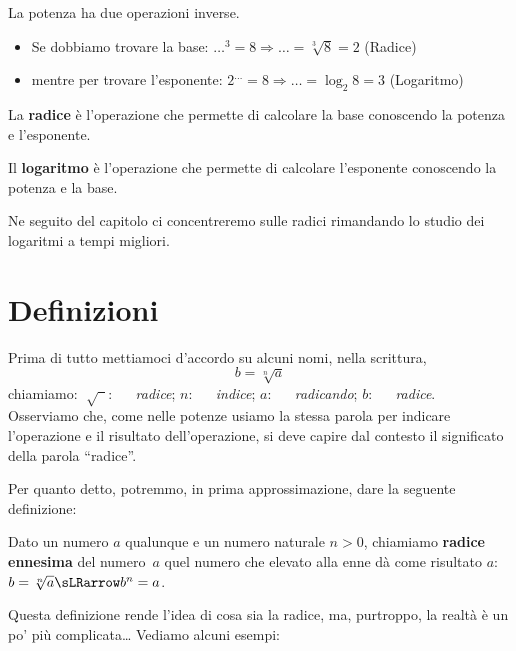 La potenza ha due operazioni inverse. 
\begin{itemize}
\item 
Se dobbiamo trovare la base: \quad 
\(\dots ^3 = 8 \Rightarrow \dots = \sqrt[3]{8} = 2\) (Radice)
\item 
mentre per trovare l'esponente: \quad 
\(2 ^{\dots} = 8 \Rightarrow \dots = \log_{2}{8} = 3\) (Logaritmo)
\end{itemize}

\begin{definizione}{}{}
La \textbf{radice} è l'operazione che permette di calcolare la base
conoscendo la potenza e l'esponente.
\end{definizione}

\begin{definizione}{}{}
Il \textbf{logaritmo} è l'operazione che permette di calcolare
l'esponente conoscendo la potenza e la base.
\end{definizione}

Ne seguito del capitolo ci concentreremo sulle radici rimandando lo studio
dei logaritmi a tempi migliori. 

\section{Definizioni}
\label{sec:radicali_definizioni}

Prima di tutto mettiamoci d'accordo su alcuni nomi, nella scrittura,
{\large
\[b=\sqrt[n]{a}\]
}
{\normalsize
chiamiamo:}
{\large 
\(\sqrt[]{\phantom{a}}\): ~~ \emph{radice}; \quad
\(n\): ~~ \emph{indice}; \quad
\(a\): ~~ \emph{radicando}; \quad
\(b\): ~~ \emph{radice}.
}\\[.5em]
\normalsize
Osserviamo che, come nelle potenze usiamo la stessa parola per indicare 
l'operazione e il risultato dell'operazione, si deve capire dal contesto il 
significato della parola ``radice''.

Per quanto detto, potremmo, in prima approssimazione,  dare la seguente 
definizione: 

\begin{definizione}{}{}
Dato un numero \(a\) qualunque e un numero naturale \(n > 0\),
chiamiamo \textbf{radice ennesima} del numero~\(a\) quel numero che 
elevato alla enne dà come risultato \(a\): \quad 
\(b=\sqrt[n]{a} \sLRarrow b^n=a\).
\end{definizione}

Questa definizione rende l'idea di cosa sia la radice, ma, purtroppo, la 
realtà è un po' più complicata\dots 
Vediamo alcuni esempi:

